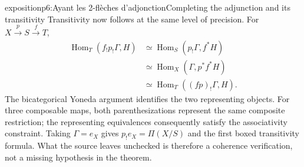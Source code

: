 \begin{dcomment}{exposition}{p6:Ayant les 2-flèches d'adjonction}{Completing the adjunction and its transitivity}
Transitivity now follows at the same level of precision. For $X\xrightarrow{p}S\xrightarrow{f}T$,
\[
\begin{aligned}
 \operatorname{Hom}_T(f_!p_!\Gamma,H)
 &\simeq\operatorname{Hom}_S(p_!\Gamma,f^*H)\\
 &\simeq\operatorname{Hom}_X(\Gamma,p^*f^*H)\\
 &\simeq\operatorname{Hom}_T((fp)_!\Gamma,H).
\end{aligned}
\]
The bicategorical Yoneda argument identifies the two representing objects. For three composable maps, both parenthesizations represent the same composite restriction; the representing equivalences consequently satisfy the associativity constraint. Taking $\Gamma=e_X$ gives $p_!e_X=\Pi(X/S)$ and the first boxed transitivity formula. What the source leaves unchecked is therefore a coherence verification, not a missing hypothesis in the theorem.
\end{dcomment}

